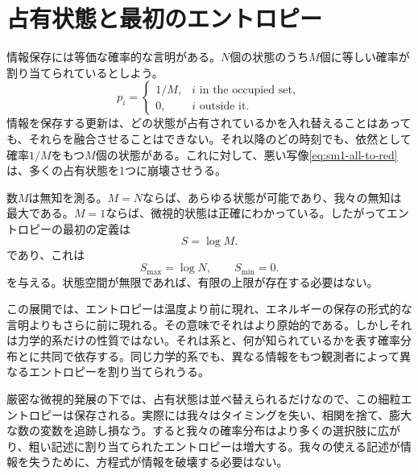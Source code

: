 \begin{classroomqa}
\end{classroomqa}

\section{占有状態と最初のエントロピー}

情報保存には等価な確率的な言明がある。\(N\)個の状態のうち\(M\)個に等しい確率が割り当てられているとしよう。
\begin{equation}
 p_i=
 \begin{cases}
 1/M, & i\text{ in the occupied set},\\
 0, & i\text{ outside it}.
 \end{cases}
 \label{eq:sm1-uniform-occupied}
\end{equation}
情報を保存する更新は、どの状態が占有されているかを入れ替えることはあっても、それらを融合させることはできない。それ以降のどの時刻でも、依然として確率\(1/M\)をもつ\(M\)個の状態がある。これに対して、悪い写像\eqref{eq:sm1-all-to-red}は、多くの占有状態を1つに崩壊させうる。

数\(M\)は無知を測る。\(M=N\)ならば、あらゆる状態が可能であり、我々の無知は最大である。\(M=1\)ならば、微視的状態は正確にわかっている。したがってエントロピーの最初の定義は
\begin{equation}
 S=\log M.
 \label{eq:sm1-entropy-logm}
\end{equation}
であり、これは
\begin{equation}
 S_{\max}=\log N,
 \qquad
 S_{\min}=0.
\end{equation}
を与える。状態空間が無限であれば、有限の上限が存在する必要はない。

この展開では、エントロピーは温度より前に現れ、エネルギーの保存の形式的な言明よりもさらに前に現れる。その意味でそれはより原始的である。しかしそれは力学的系だけの性質ではない。それは系と、何が知られているかを表す確率分布とに共同で依存する。同じ力学的系でも、異なる情報をもつ観測者によって異なるエントロピーを割り当てられうる。

厳密な微視的発展の下では、占有状態は並べ替えられるだけなので、この細粒エントロピーは保存される。実際には我々はタイミングを失い、相関を捨て、膨大な数の変数を追跡し損なう。すると我々の確率分布はより多くの選択肢に広がり、粗い記述に割り当てられたエントロピーは増大する。我々の使える記述が情報を失うために、方程式が情報を破壊する必要はない。

